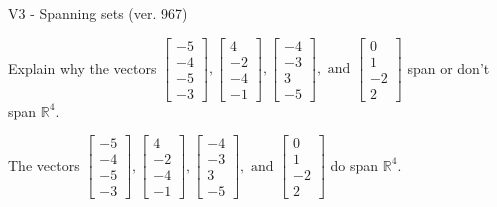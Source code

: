 \begin{exercise}
  \begin{exerciseTitle}V3 - Spanning sets (ver. 967)\end{exerciseTitle}
  \begin{exerciseStatement}
    Explain why the vectors \(\left[\begin{array}{r}
-5 \\
-4 \\
-5 \\
-3
\end{array}\right] , \left[\begin{array}{r}
4 \\
-2 \\
-4 \\
-1
\end{array}\right] , \left[\begin{array}{r}
-4 \\
-3 \\
3 \\
-5
\end{array}\right] , \text{ and } \left[\begin{array}{r}
0 \\
1 \\
-2 \\
2
\end{array}\right]\) span or don't span \(\mathbb{R}^4\). 
	


  \end{exerciseStatement}
  \begin{exerciseAnswer}
   The vectors \(\left[\begin{array}{r}
-5 \\
-4 \\
-5 \\
-3
\end{array}\right] , \left[\begin{array}{r}
4 \\
-2 \\
-4 \\
-1
\end{array}\right] , \left[\begin{array}{r}
-4 \\
-3 \\
3 \\
-5
\end{array}\right] , \text{ and } \left[\begin{array}{r}
0 \\
1 \\
-2 \\
2
\end{array}\right]\) 
  	 do  
	span \(\mathbb{R}^4\).
  


  \end{exerciseAnswer}
\end{exercise}
